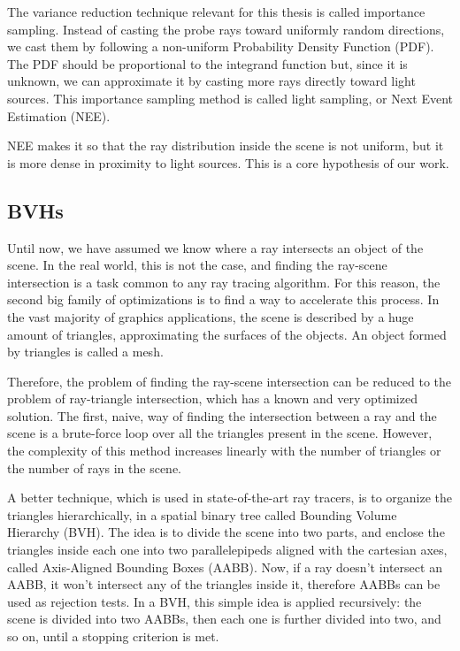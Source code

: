 \documentclass[11pt,a4paper,twocolumn]{article}
\begin{document}
The variance reduction technique relevant for this thesis is called importance sampling. Instead of casting the probe rays toward uniformly random directions, we cast them by following a non-uniform Probability Density Function (PDF). The PDF should be proportional to the integrand function but, since it is unknown, we can approximate it by casting more rays directly toward light sources. This importance sampling method is called light sampling, or Next Event Estimation (NEE).

NEE makes it so that the ray distribution inside the scene is not uniform, but it is more dense in proximity to light sources. This is a core hypothesis of our work.

\subsection{BVHs}
Until now, we have assumed we know where a ray intersects an object of the scene. In the real world, this is not the case, and finding the ray-scene intersection is a task common to any ray tracing algorithm. For this reason, the second big family of optimizations is to find a way to accelerate this process. In the vast majority of graphics applications, the scene is described by a huge amount of triangles, approximating the surfaces of the objects. An object formed by triangles is called a mesh.

Therefore, the problem of finding the ray-scene intersection can be reduced to the problem of ray-triangle intersection, which has a known and very optimized solution. The first, naive, way of finding the intersection between a ray and the scene is a brute-force loop over all the triangles present in the scene. However, the complexity of this method increases linearly with the number of triangles or the number of rays in the scene. 

A better technique, which is used in state-of-the-art ray tracers, is to organize the triangles hierarchically, in a spatial binary tree called Bounding Volume Hierarchy (BVH). The idea is to divide the scene into two parts, and enclose the triangles inside each one into two parallelepipeds aligned with the cartesian axes, called Axis-Aligned Bounding Boxes (AABB). Now, if a ray doesn't intersect an AABB, it won't intersect any of the triangles inside it, therefore AABBs can be used as rejection tests. In a BVH, this simple idea is applied recursively: the scene is divided into two AABBs, then each one is further divided into two, and so on, until a stopping criterion is met.
\end{document}
